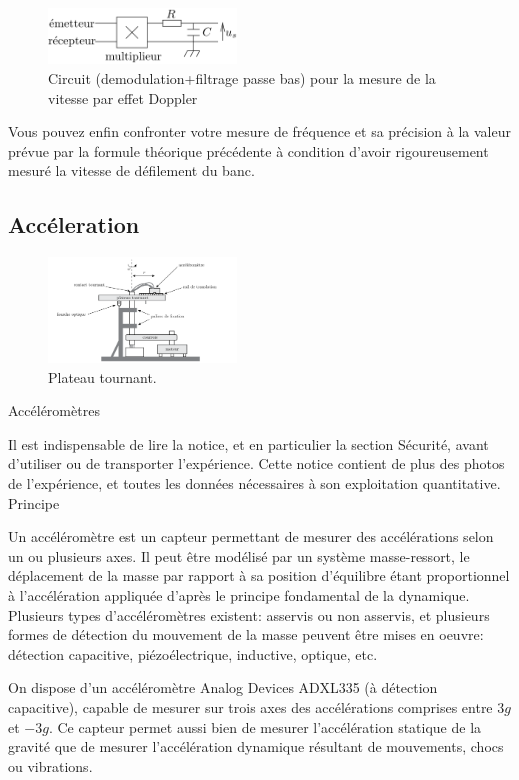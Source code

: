 \documentclass{article}%
\begin{document}
\begin{figure}
	\centerline{\includegraphics[width=5cm]{images-exp/CircuitEffetDoppler.png}}
	\caption{Circuit (demodulation+filtrage passe bas) pour la mesure de la vitesse par effet Doppler}
\end{figure}
Vous pouvez enfin confronter votre mesure de fréquence et sa précision à la valeur prévue par la formule théorique précédente à condition d'avoir rigoureusement mesuré la vitesse de défilement du banc. 

\subsection{Accéleration}
\begin{figure}
	\centerline{\includegraphics[width=5cm]{images-exp/Plateau_tournant.png}}
	\caption{Plateau tournant.}
\end{figure}

Accéléromètres

Il est indispensable de lire la notice, et en particulier la section Sécurité, avant d'utiliser ou de transporter l'expérience. Cette notice contient de plus des photos de l'expérience, et toutes les données nécessaires à son exploitation quantitative.
Principe

Un accéléromètre est un capteur permettant de mesurer des accélérations selon un ou plusieurs axes. Il peut être modélisé par un système masse-ressort, le déplacement de la masse par rapport à sa position d'équilibre étant proportionnel à l'accélération appliquée d'après le principe fondamental de la dynamique. Plusieurs types d'accéléromètres existent: asservis ou non asservis, et plusieurs formes de détection du mouvement de la masse peuvent être mises en oeuvre: détection capacitive, piézoélectrique, inductive, optique, etc.

On dispose d'un accéléromètre Analog Devices ADXL335 (à détection capacitive), capable de mesurer sur trois axes des accélérations comprises entre $3g$ et $-3g$. Ce capteur permet aussi bien de mesurer l'accélération statique de la gravité que de mesurer l'accélération dynamique résultant de mouvements, chocs ou vibrations.
\end{document}
